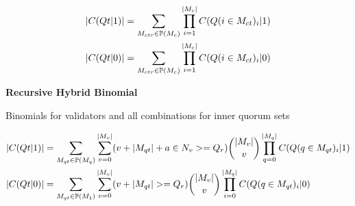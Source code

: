 \documentclass[10pt]{article}
\begin{document}
\begin{align}
  \left\vert{ C(Qt|1) }\right\vert &=
        \sum_{ M_{ctr} \in \mathbb{P}( M_{c} ) }
        \prod_{i=1}^{ \left\vert{M_c}\right\vert }
                C(Q(i \in M_{ct})_i|1)
  \\
  \left\vert{ C(Qt|0) }\right\vert &=
        \sum_{ M_{ctr} \in \mathbb{P}( M_{c} ) }
        \prod_{i=1}^{ \left\vert{M_c}\right\vert }
                C(Q(i \in M_{ct})_i|0)
\end{align}


\textbf{Recursive Hybrid Binomial}\\\par
Binomials for validators and all combinations for inner quorum sets



\begin{align}
  \left\vert{ C(Qt|1) }\right\vert &=
        \sum_{ M_{qt} \in \mathbb{P}( M_{q} ) }
        \sum_{ v=0 }^{ \left\vert{M_v}\right\vert }
           (v + \left\vert{M_{qt}}\right\vert + a \in N_{v}>= Q_r)
           \binom{ \left\vert{M_v}\right\vert }{ v }
           \prod_{q=0}^{ \left\vert{M_q}\right\vert } C(Q(q \in M_{qt})_i|1)
  \\
  \left\vert{ C(Qt|0) }\right\vert &=
        \sum_{ M_{qt} \in \mathbb{P}( M_{1} ) }
        \sum_{ v=0 }^{ \left\vert{M_v}\right\vert }
           (v + \left\vert{M_{qt}}\right\vert >= Q_r)
           \binom{ \left\vert{M_v}\right\vert }{ v }
           \prod_{i=0}^{ \left\vert{M_q}\right\vert } C(Q(q \in M_{qt})_i|0)
\end{align}
\end{document}
